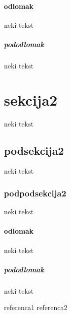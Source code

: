 \documentclass[a4paper,12pt]{amsart}
\theoremstyle{plain}
\theoremstyle{definition}
\theoremstyle{remark}
\begin{document}
\paragraph{odlomak}
neki tekst
\subparagraph{pododlomak}
neki tekst

\section{sekcija2}
neki tekst
\subsection{podsekcija2}
neki tekst
\subsubsection{podpodsekcija2}
neki tekst
\paragraph{odlomak}
neki tekst
\subparagraph{pododlomak}
neki tekst




\begin{thebibliography}{99} %
 referenca1
 referenca2
\end{thebibliography}

\end{document}
